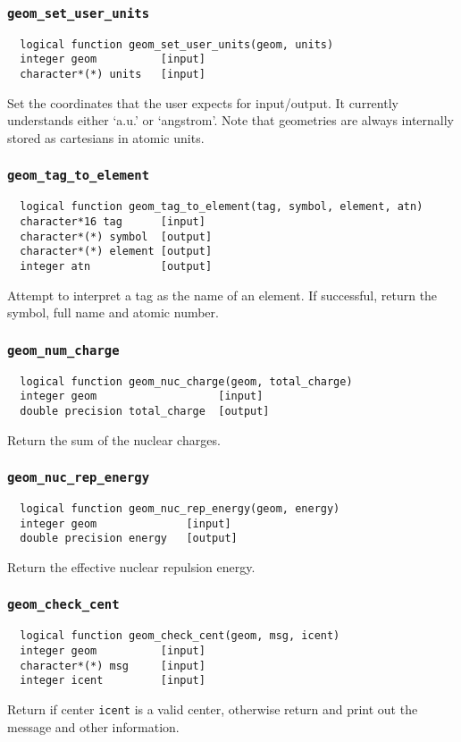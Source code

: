 \subsubsection{{\tt geom\_set\_user\_units}}
\begin{verbatim}
  logical function geom_set_user_units(geom, units)
  integer geom          [input]
  character*(*) units   [input]
\end{verbatim}
Set the coordinates that the user expects for input/output.  It
currently understands either `a.u.' or `angstrom'.  Note that
geometries are always internally stored as cartesians in atomic units.

\subsubsection{{\tt geom\_tag\_to\_element}}
\begin{verbatim}
  logical function geom_tag_to_element(tag, symbol, element, atn)
  character*16 tag      [input]
  character*(*) symbol  [output]
  character*(*) element [output]
  integer atn           [output]
\end{verbatim}
Attempt to interpret a tag as the name of an element.  If successful,
return the symbol, full name and atomic number.

\subsubsection{{\tt geom\_num\_charge}}
\begin{verbatim}
  logical function geom_nuc_charge(geom, total_charge)
  integer geom                   [input]
  double precision total_charge  [output]
\end{verbatim}
Return the sum of the nuclear charges.

\subsubsection{{\tt geom\_nuc\_rep\_energy}}
\begin{verbatim}
  logical function geom_nuc_rep_energy(geom, energy)
  integer geom              [input]
  double precision energy   [output]
\end{verbatim}
Return the effective nuclear repulsion energy.

\subsubsection{{\tt geom\_check\_cent}}
\begin{verbatim}
  logical function geom_check_cent(geom, msg, icent)
  integer geom          [input]
  character*(*) msg     [input]
  integer icent         [input]
\end{verbatim}
Return \TRUE if center \verb+icent+ is a valid center,
otherwise return \FALSE and print out the message and other
information. 

